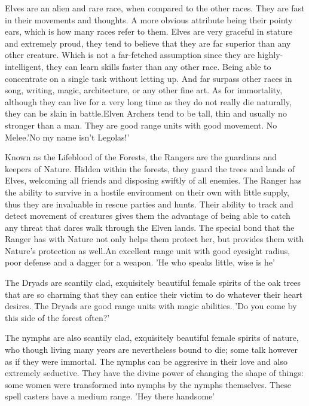 \documentclass[a4paper,twocolumn]{article}
\begin{document}
Elves are an alien and rare race, when compared to the other races.  They are fast in their movements and thoughts. A more obvious attribute being their pointy ears, which is how many races refer to them. Elves are very graceful in stature and extremely proud, they tend to believe that they are far superior than any other creature. Which is not a far-fetched assumption since they are highly-intelligent, they can learn skills faster than any other race. Being able to concentrate on a single task without letting up. And far surpass other races in song, writing, magic, architecture, or any other fine art. As for immortality, although they can live for a very long time as they do not really die naturally, they can be slain in battle.Elven Archers tend to be tall, thin and usually no stronger than a man. They are good range units with good movement. No Melee.'No my name isn't Legolas!'

Known as the Lifeblood of the Forests, the Rangers are the guardians and keepers of Nature. Hidden within the forests, they guard the trees and lands of Elves, welcoming all friends and disposing swiftly of all enemies. The Ranger has the ability to survive in a hostile environment on their own with little supply, thus they are invaluable in rescue parties and hunts. Their ability to track and detect movement of creatures gives them the advantage of being able to catch any threat that dares walk through the Elven lands. The special bond that the Ranger has with Nature not only helps them protect her, but provides them with Nature's protection as well.An excellent range unit with good eyesight radius, poor defense and a dagger for a weapon. 'He who speaks little, wise is he'

The Dryads are scantily clad, exquisitely beautiful female spirits of the oak trees that are so charming that they can entice their victim to do whatever their heart desires. The Dryads are good range units with magic abilities. 'Do you come by this side of the forest often?'

The nymphs are also scantily clad, exquisitely beautiful female spirits of nature, who though living many years are nevertheless bound to die; some talk however as if they were immortal. The nymphs can be aggresive in their love and also extremely seductive. They have the divine power of changing the shape of things: some women were transformed into nymphs by the nymphs themselves. These spell casters have a medium range. 'Hey there handsome'
\end{document}
